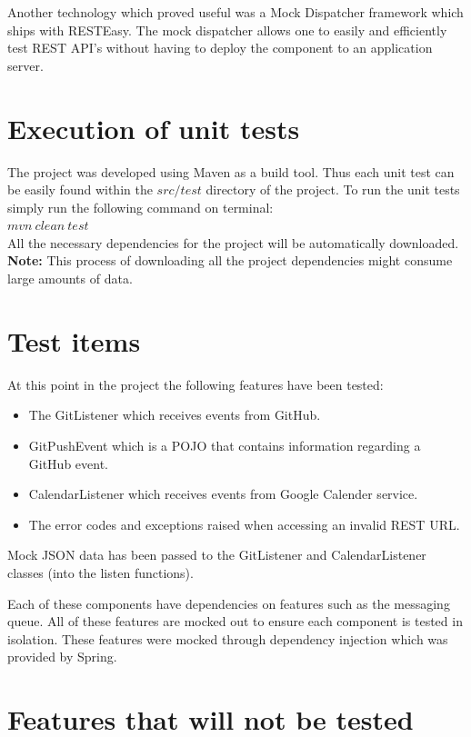 \documentclass[11pt,a4paper]{article}
\begin{document}
Another technology which proved useful was a Mock Dispatcher framework which ships with RESTEasy. The mock dispatcher allows one to easily and efficiently test REST API's without having to deploy the component to an application server.

\section{Execution of unit tests}
The project was developed using Maven as a build tool. Thus each unit test can be easily found within the $src/test$ directory of the project. To run the unit tests simply run the following command on terminal: \\

$mvn\ clean\ test$ \\

All the necessary dependencies for the project will be automatically downloaded. \textbf{Note:} This process of downloading all the project dependencies might consume large amounts of data.

\section{Test items}
At this point in the project the following features have been tested:
\begin{itemize}
	\item The GitListener which receives events from GitHub.
	\item GitPushEvent which is a POJO that contains information regarding a GitHub event.
	\item CalendarListener which receives events from Google Calender service.
	\item The error codes and exceptions raised when accessing an invalid REST URL.
\end{itemize}

Mock JSON data has been passed to the GitListener and CalendarListener classes (into the listen functions). 

Each of these components have dependencies on features such as the messaging queue. All of these features are mocked out to ensure each component is tested in isolation. These features were mocked through dependency injection which was provided by Spring. \\

\section{Features that will not be tested}
\end{document}
